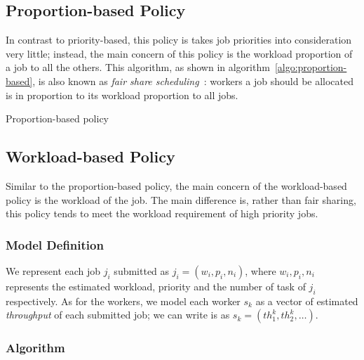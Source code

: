 \subsection{Proportion-based Policy}

In contrast to priority-based, this policy is takes job priorities into
consideration very little; instead, the main concern of this policy is
the workload proportion of a job to all the others.
This algorithm, as shown in algorithm~\ref{algo:proportion-based}, is
also known as \emph{fair share
scheduling}~\cite{cite:fair-share-scheduling}: workers a job should be
allocated is in proportion to its workload proportion to all jobs. 


\begin{algorithm}[]
  
  \caption{Proportion-based policy}
  \label{algo:proportion-based}
\end{algorithm}

\subsection{Workload-based Policy}

Similar to the proportion-based policy, the main concern of the
workload-based policy is the workload of the job.
The main difference is, rather than fair sharing, this policy tends to
meet the workload requirement of high priority jobs.

\subsubsection{Model Definition}

We represent each job $j_i$ submitted as $j_i = (w_i, p_i, n_i)$, where
$w_i, p_i, n_i$ represents the estimated workload, priority and the
number of task of $j_i$ respectively.
As for the workers, we model each worker $s_k$ as a vector of estimated
\emph{throughput} of each submitted job; we can write is as $s_k =
(th^k_1, th^k_2, \ldots)$.


\subsubsection{Algorithm}


